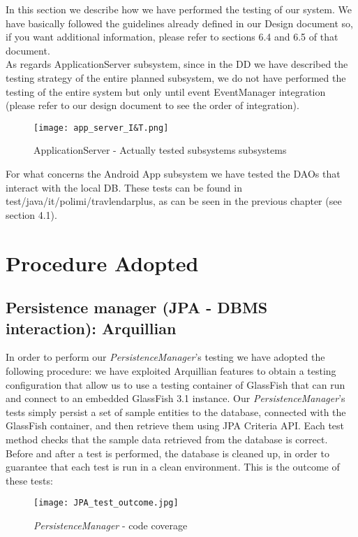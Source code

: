 In this section we describe how we have performed the testing of our system.
We have basically followed the guidelines already defined in our Design document so, if you want additional information, please refer to sections 6.4 and 6.5 of that document. \\
As regards ApplicationServer subsystem, since in the DD we have described the testing strategy of the entire planned subsystem, we do not have performed the testing of the entire system but only until event EventManager integration (please refer to our design document to see the order of integration).\\
\begin{figure}[H]
	\begin{center}
		\hspace*{-40pt}
		\texttt{[image: app\_server\_I\&T.png]}
	\end{center}
\caption{ ApplicationServer - Actually tested subsystems subsystems}
\end{figure}
\newpage \noindent
For what concerns the Android App subsystem we have tested the DAOs that interact with the local DB. These tests can be found in test/java/it/polimi/travlendarplus, as can be seen in the previous chapter (see section 4.1).

\section{Procedure Adopted}
\subsection{Persistence manager (JPA - DBMS interaction): Arquillian}
In order to perform our \textit{PersistenceManager}'s testing we have adopted the following procedure: we have exploited Arquillian features to obtain a testing configuration that allow us to use a testing container of GlassFish that can run and connect to an embedded GlassFish 3.1 instance.
Our \textit{PersistenceManager}'s tests simply  persist a set of sample entities to the database, connected with the GlassFish container, and then retrieve them using JPA Criteria API.
Each test method checks that the sample data retrieved from the database is correct. Before and after a test is performed, the database is cleaned up, in order to guarantee that each test is run in a clean environment.
This is the outcome of these tests:
\begin{figure}[H]
	\begin{center}
		\texttt{[image: JPA\_test\_outcome.jpg]}
	\end{center}
\caption{ \textit{PersistenceManager} - code coverage}
\end{figure}

